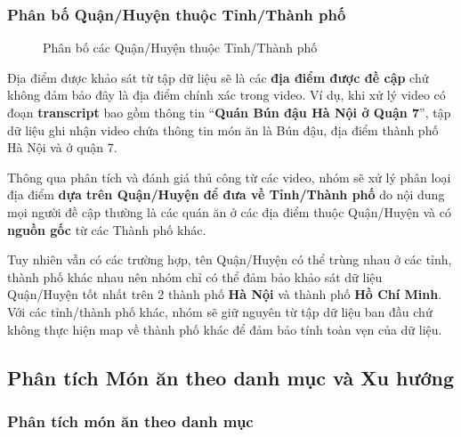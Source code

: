 \subsubsection{Phân bố Quận/Huyện thuộc Tỉnh/Thành phố}
\begin{figure}[H]
    \centering
    \caption{Phân bố các Quận/Huyện thuộc Tỉnh/Thành phố}
    \label{fig:quan_huyen}
\end{figure}

Địa điểm được khảo sát từ tập dữ liệu sẽ là các \textbf{địa điểm được đề cập} chứ không đảm bảo đây là địa điểm chính xác trong video. Ví dụ, khi xử lý video có đoạn \textbf{transcript} bao gồm thông tin ``\textbf{Quán Bún đậu Hà Nội ở Quận 7}'', tập dữ liệu ghi nhận video chứa thông tin món ăn là Bún đậu, địa điểm thành phố Hà Nội và ở quận 7. 

Thông qua phân tích và đánh giá thủ công từ các video, nhóm sẽ xử lý phân loại địa điểm \textbf{dựa trên Quận/Huyện để đưa về Tỉnh/Thành phố} do nội dung mọi người đề cập thường là các quán ăn ở các địa điểm thuộc Quận/Huyện và có \textbf{nguồn gốc} từ các Thành phố khác. 

Tuy nhiên vẫn có các trường hợp, tên Quận/Huyện có thể trùng nhau ở các tỉnh, thành phố khác nhau nên nhóm chỉ có thể đảm bảo khảo sát dữ liệu Quận/Huyện tốt nhất trên 2 thành phố \textbf{Hà Nội} và thành phố \textbf{Hồ Chí Minh}. Với các tỉnh/thành phố khác, nhóm sẽ giữ nguyên từ tập dữ liệu ban đầu chứ không thực hiện map về thành phố khác để đảm bảo tính toàn vẹn của dữ liệu.


\subsection{Phân tích Món ăn theo danh mục và Xu hướng}

\subsubsection{Phân tích món ăn theo danh mục}

